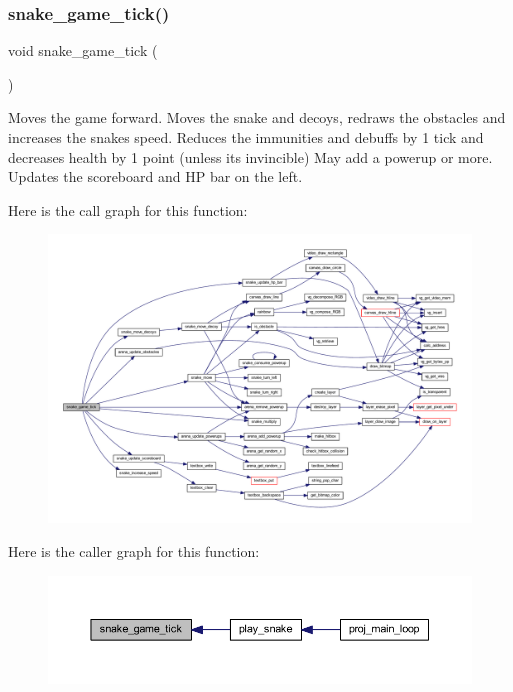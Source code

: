 \subsubsection{\texorpdfstring{snake\+\_\+game\+\_\+tick()}{snake\_game\_tick()}}
{\footnotesize\ttfamily void snake\+\_\+game\+\_\+tick (\begin{DoxyParamCaption}{ }\end{DoxyParamCaption})}



Moves the game forward. Moves the snake and decoys, redraws the obstacles and increases the snake\textquotesingle{}s speed. Reduces the immunities and debuffs by 1 tick and decreases health by 1 point (unless it\textquotesingle{}s invincible) May add a powerup or more. Updates the scoreboard and HP bar on the left. 

Here is the call graph for this function\+:\nopagebreak
\begin{figure}[H]
\begin{center}
\leavevmode
\includegraphics[width=350pt]{group__snake_gae59edc17cc6d3f6f1fef0d047304265b_cgraph}
\end{center}
\end{figure}
Here is the caller graph for this function\+:\nopagebreak
\begin{figure}[H]
\begin{center}
\leavevmode
\includegraphics[width=350pt]{group__snake_gae59edc17cc6d3f6f1fef0d047304265b_icgraph}
\end{center}
\end{figure}
\mbox{\label{group__snake_gac8f7c40125feaa0d1e72d6a032882f49}} 
